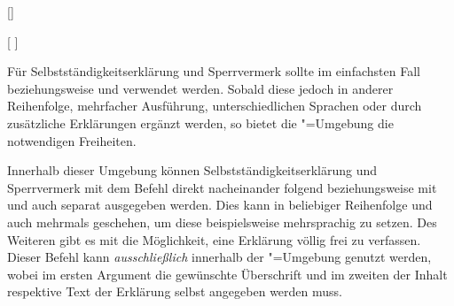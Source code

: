 \begin{Declaration*}{}
\begin{Declaration*}{}
\begin{Declaration*}{}
\begin{Declaration}{[]}
\begin{Declaration}{%
  [%
  ]%
}
\begin{Declaration}{}
\begin{Declaration}{}
\begin{Declaration}{%
}
\begin{Declaration}{%
}
\begin{Declaration}{}
\begin{Declaration}{%
}
\begin{Declaration}{}
\begin{Declaration}{}
\begin{Declaration}{}
\printdeclarationlist%
%
Für Selbstständigkeitserklärung und Sperrvermerk sollte im einfachsten Fall 
 beziehungsweise  und  
verwendet werden. Sobald diese jedoch in anderer Reihenfolge, mehrfacher 
Ausführung, unterschiedlichen Sprachen oder durch zusätzliche Erklärungen 
ergänzt werden, so bietet die "=Umgebung die 
notwendigen Freiheiten.

Innerhalb dieser Umgebung können Selbstständigkeitserklärung und Sperrvermerk 
mit dem Befehl  direkt nacheinander folgend beziehungsweise 
mit  und  auch separat ausgegeben werden. 
Dies kann in beliebiger Reihenfolge und auch mehrmals geschehen, um diese 
beispielsweise mehrsprachig zu setzen.
 Des Weiteren gibt es mit  die 
Möglichkeit, eine Erklärung völlig frei zu verfassen. Dieser Befehl kann 
\emph{ausschließlich} innerhalb der "=Umgebung 
genutzt werden, wobei im ersten Argument die gewünschte Überschrift und im 
zweiten der Inhalt respektive Text der Erklärung selbst angegeben werden muss.


\end{Declaration}
\end{Declaration}
\end{Declaration}
\end{Declaration}
\end{Declaration}
\end{Declaration}
\end{Declaration}
\end{Declaration}
\end{Declaration}
\end{Declaration}
\end{Declaration}
\end{Declaration*}
\end{Declaration*}
\end{Declaration*}
